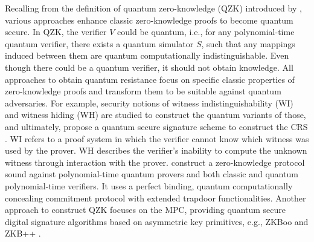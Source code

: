 Recalling from the definition of quantum zero-knowledge (QZK) introduced by \citet{watrousqzk}, various approaches enhance classic zero-knowledge proofs to become quantum secure. In QZK, the verifier \(V\) could be quantum, i.e., for any polynomial-time quantum verifier, there exists a quantum simulator \(S\), such that any mappings induced between them are quantum computationally indistinguishable. Even though there could be a quantum verifier, it should not obtain knowledge. All approaches to obtain quantum resistance focus on specific classic properties of zero-knowledge proofs and transform them to be suitable against quantum adversaries. For example, security notions of witness indistinguishability (WI) and witness hiding (WH) are studied to construct the quantum variants of those, and ultimately, propose a quantum secure signature scheme to construct the CRS \citep{xieyang2019, katzetal}. WI refers to a proof system in which the verifier cannot know which witness was used by the prover. WH describes the verifier's inability to compute the unknown witness through interaction with the prover. \citet{Vidick2020classicalzero} construct a zero-knowledge protocol sound against polynomial-time quantum provers and both classic and quantum polynomial-time verifiers. It uses a perfect binding, quantum computationally concealing commitment protocol with extended trapdoor functionalities. Another approach to construct QZK focuses on the MPC, providing quantum secure digital signature algorithms based on asymmetric key primitives, e.g., ZKBoo and ZKB++ \citep{gongetal}.


